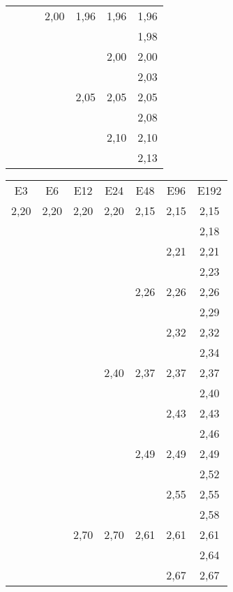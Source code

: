 \begin{tiny}
\begin{tabular}{@{}c@{ }c@{ }c@{ }c@{ }c@{ }c@{ }c}
     &      &      & 2,00 & 1,96 & 1,96 & 1,96 \\
     &      &      &      &      &      & 1,98 \\
     &      &      &      &      & 2,00 & 2,00 \\
     &      &      &      &      &      & 2,03 \\
     &      &      &      & 2,05 & 2,05 & 2,05 \\
     &      &      &      &      &      & 2,08 \\
     &      &      &      &      & 2,10 & 2,10 \\
     &      &      &      &      &      & 2,13 
\end{tabular}
\begin{tabular}{@{}c@{ }c@{ }c@{ }c@{ }c@{ }c@{ }c}
  E3 & E6   & E12  & E24  & E48 &  E96  & E192 \\
2,20 & 2,20 & 2,20 & 2,20 & 2,15 & 2,15 & 2,15 \\
     &      &      &      &      &      & 2,18 \\
     &      &      &      &      & 2,21 & 2,21 \\
     &      &      &      &      &      & 2,23 \\
     &      &      &      & 2,26 & 2,26 & 2,26 \\
     &      &      &      &      &      & 2,29 \\
     &      &      &      &      & 2,32 & 2,32 \\
     &      &      &      &      &      & 2,34 \\
     &      &      & 2,40 & 2,37 & 2,37 & 2,37 \\
     &      &      &      &      &      & 2,40 \\
     &      &      &      &      & 2,43 & 2,43 \\
     &      &      &      &      &      & 2,46 \\
     &      &      &      & 2,49 & 2,49 & 2,49 \\
     &      &      &      &      &      & 2,52 \\
     &      &      &      &      & 2,55 & 2,55 \\
     &      &      &      &      &      & 2,58 \\
     &      & 2,70 & 2,70 & 2,61 & 2,61 & 2,61 \\
     &      &      &      &      &      & 2,64 \\
     &      &      &      &      & 2,67 & 2,67 \\

\end{tabular}
\end{tiny}
